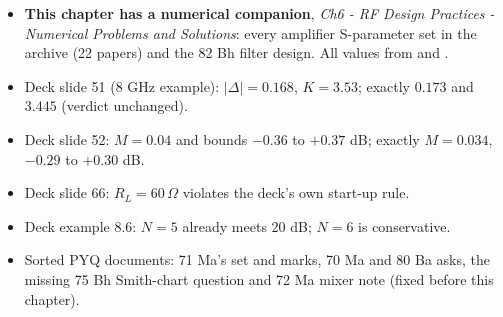 \begin{itemize}
  \item \textbf{This chapter has a numerical companion}, \textit{Ch6 - RF Design Practices -
    Numerical Problems and Solutions}: every amplifier S-parameter set in the archive
    (22 papers) and the 82 Bh filter design. All values from  and
    .
\end{itemize}

\begin{itemize}
  \item Deck slide 51 (8 GHz example): $|\Delta| = 0.168$, $K = 3.53$; exactly
    $0.173$ and $3.445$ (verdict unchanged).
  \item Deck slide 52: $M = 0.04$ and bounds $-0.36$ to $+0.37$ dB; exactly $M = 0.034$,
    $-0.29$ to $+0.30$ dB.
  \item Deck slide 66: $R_L = 60\,\Omega$ violates the deck's own start-up rule.
  \item Deck example 8.6: $N = 5$ already meets 20 dB; $N = 6$ is conservative.
  \item Sorted PYQ documents: 71 Ma's set and marks, 70 Ma and 80 Ba asks, the missing
    75 Bh Smith-chart question and 72 Ma mixer note (fixed before this chapter).
\end{itemize}
